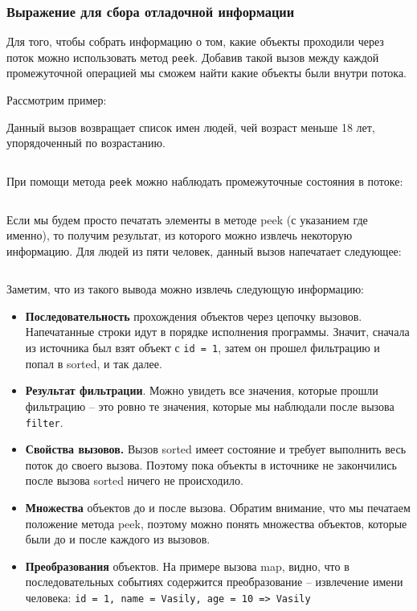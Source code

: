 \subsubsection{Выражение для сбора отладочной информации}\label{build-expression}
Для того, чтобы собрать информацию о том, какие объекты проходили через поток можно использовать метод \texttt{peek}. Добавив такой вызов между каждой промежуточной операцией мы сможем найти какие объекты были внутри потока.

Рассмотрим пример:

Данный вызов возвращает список имен людей, чей возраст меньше 18 лет, упорядоченный по возрастанию.
\inputminted{java}{chapter2/code/StreaMWithoutPeeks.java}
При помощи метода \texttt{peek} можно наблюдать промежуточные состояния в потоке:
\inputminted{java}{chapter2/code/StreamWithPeeks.java}

Если мы будем просто печатать элементы в методе peek (с указанием где именно), то получим результат, из которого можно извлечь некоторую информацию. Для людей из пяти человек, данный вызов напечатает следующее:
\inputminted{java}{chapter2/code/peekResults.txt}

Заметим, что из такого вывода можно извлечь следующую информацию:
\begin{itemize}
	\item \textbf{Последовательность} прохождения объектов через цепочку вызовов. Напечатанные строки идут в порядке исполнения программы. Значит, сначала из источника был взят объект с \texttt{id = 1}, затем он прошел фильтрацию и попал в sorted, и так далее.
	\item \textbf{Результат фильтрации}. Можно увидеть все значения, которые прошли фильтрацию -- это ровно те значения, которые мы наблюдали после вызова \texttt{filter}.
	\item \textbf{Свойства вызовов.} Вызов sorted имеет состояние и требует выполнить весь поток до своего вызова. Поэтому пока объекты в источнике не закончились после вызова sorted ничего не происходило.
	\item \textbf{Множества } объектов до и после вызова. Обратим внимание, что мы печатаем положение метода peek, поэтому можно понять множества объектов, которые были до и после каждого из вызовов.
	\item \textbf{Преобразования} объектов. На примере вызова map, видно, что в последовательных событиях содержится преобразование -- извлечение имени человека: \texttt{{id = 1, name = Vasily, age = 10} => Vasily}
\end{itemize}

